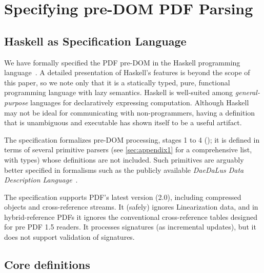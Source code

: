\section{Specifying pre-DOM PDF Parsing}
\label{sec:specifying}

\subsection{Haskell as Specification Language}
\label{sec:spec-language}

We have formally specified the PDF pre-DOM in the Haskell programming
language~\cite{jones2003haskell}.
%
A detailed presentation of Haskell's features is beyond the scope of
this paper, so we note only that it is a statically typed, pure,
functional programming language with lazy semantics.
%
Haskell is
well-suited among \emph{general-purpose} languages for
declaratively expressing computation.
Although Haskell may not be ideal for communicating with non-programmers,
having a definition that is unambiguous and executable has shown itself
to be a useful artifact.

The specification formalizes pre-DOM processing, stages 1 to 4
();
%
it is defined in terms of several primitive parsers (see
\cref{sec:appendix1} for a comprehensive list, with types) whose
definitions are not included.
%
Such primitives are arguably better specified in formalisms such as
the publicly available \emph{DaeDaLus Data Description
  Language}~\cite{daedalusrepo}.

The specification supports PDF's latest version (2.0), including compressed objects and cross-reference streams.
%
It (safely) ignores Linearization data, and in hybrid-reference PDFs
it ignores the conventional cross-reference tables designed for pre PDF 1.5 readers.
It processes signatures (as incremental updates), but it does not support
validation of signatures.

\subsection{Core definitions}
\label{sec:core}
\iffalse
\begin{code}
{-# LANGUAGE EmptyDataDecls, TypeOperators, LambdaCase #-}
module Spec where
import           Control.Monad
import           Data.Char
import           Data.Foldable(foldlM)
import qualified Data.IntSet as IntSet
import           Data.List
import qualified Data.Map as M
import           Data.Map(Map)
import           Types hiding (XRefEntry,SEEK,Update) -- defs dupd here!
import           Utils
import           Primitives
import           Streams
\end{code}
\fi

